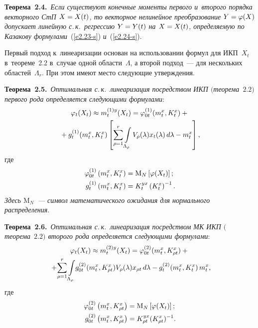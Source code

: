 \begin{multicols}{2}
\smallskip

\noindent
\textbf{Теорема~2.4.}\ \textit{Если существуют конечные моменты первого и~второго порядка векторного СтП 
$X\hm=X(t)$, то векторное нелинейное преобразование $Y\hm=\varphi(X)$ допускает линейную 
с.\,к.\ регрессию $Y\hm=Y(t)$ на $X\hm=X(t)$, определяемую по Казакову 
формулами}~(\ref{e2.23-s}) \textit{и}~(\ref{e2.24-s}).


\smallskip

Первый подход к~линеаризации основан на использовании формул для ИКП~$X_t$ 
в~тео\-ре\-ме~2.2 в~случае одной об\-ласти~$\Lambda$, а второй подход~--- для нескольких 
областей~$\Lambda_r$. При этом имеют место сле\-ду\-ющие утверж\-де\-ния.

\smallskip

\noindent
\textbf{Теорема~2.5.}\ \textit{Оптимальная с.\,к.\ линеаризация посредством ИКП $($теорема~$2.2$$)$ 
первого рода определяется следующими формулами}:
    \begin{multline*}
    \varphi_t (X_t) \approx m_t^{(1)y} (X_t) = \varphi_{0t}^{(1)} (m_t^x, K_t^x) + {}\\
    {}+
g_t^{(1)} (m_t^x, K_t^x) \lk \sum\limits_{\rho=1}^r \int\limits_{\Lambda_\rho} V_\rho (\la) 
x_t (\la) \,d\la-m_t^x\rk, %
\end{multline*}
где
\begin{align*}
\varphi_{0t}^{(1)} \left(m_t^x, K_t^x\right) &= \mathrm{M}_N \left[ \varphi (X_t)\right];\\ 
g_{t}^{(1)} \left(m_t^x, K_t^x\right) &= K_t^{yx}\left(K_t^x\right)^{-1}.
\end{align*}
\textit{Здесь $\mathrm{M}_N$~--- символ математического ожидания для нормального распределения}.

\smallskip

\noindent
\textbf{Теорема~2.6.}\ \textit{Оптимальная с.\,к.\ линеаризация посредством МК ИКП $($теорема~$2.2$$)$ 
второго рода определяется следующими формулами}:
\begin{multline*}
\varphi_t (X_t) \approx m_t^{(2)y} (X_t) = \varphi_{0t}^{(2)} (m_t^x, K_{\rho 
t}^x) +{}\\
{}+\!\sum\limits_{\rho=1}^r \int\limits_{\Lambda_\rho}\! g_{0t}^{(2)}  (m_t^x, K_{\rho t}^x) 
V_\rho (\lambda) x_{\rho t} \,d\lambda - g_t^{(2)} \! \left( m_t^x, K_t^x\right) m_t^x,\hspace*{-1.47351pt}
\end{multline*}
где
\begin{align*}
\varphi_{0t}^{(2)}  \left(m_t^x, K_{\rho t}^x\right) &=\mathrm{M}_N \left[ \varphi (X_t)\right];\\ 
g_{0t}^{(2)}  \left(m_t^x, K_{\rho t}^x\right) &=K_{\rho t}^{yx} (K_{\rho t}^x)^{-1}.
\end{align*}



\end{multicols}
